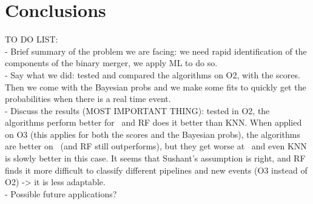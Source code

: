 \section{Conclusions\label{conclusions}}

TO DO LIST:
\\
- Brief summary of the problem we are facing: we need rapid identification of the components of the binary merger, we apply ML to do so. \\
- Say what we did: tested and compared the algorithms on O2, with the scores. Then we come with the Bayesian probs and we make some fits to quickly get the probabilities when there is a real time event. \\
- Discuss the results (MOST IMPORTANT THING): tested in O2, the algorithms perform better for \hasrem\, and RF does it better than KNN. When applied on O3 (this applies for both the scores and the Bayesian probs), the algorithms are better on \hasns\ (and RF still outperforms), but they get worse at \hasrem\, and even KNN is slowly better in this case. It seems that Sushant's assumption is right, and RF finds it more difficult to classify different pipelines and new events (O3 instead of O2) -> it is less adaptable. \\
- Possible future applications? 
